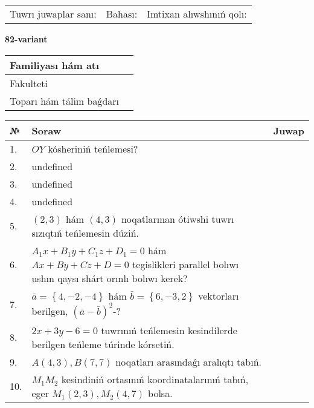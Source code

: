 \documentclass{article}
\begin{document}
\vspace{0.7cm}

\begin{tabular}{lll}
Tuwrı juwaplar sanı: \underline{\hspace{1cm}} & 
Bahası: \underline{\hspace{1cm}} & 
Imtixan alıwshınıń qolı: \underline{\hspace{2cm}} \\
\end{tabular}

\egroup

\newpage


\textbf{82-variant}\\

\bgroup
\def\arraystretch{1.6} %

\begin{tabular}{|m{5.7cm}|m{9.5cm}|}
\hline
Familiyası hám atı & \\
\hline
Fakulteti  & \\
\hline
Toparı hám tálim baǵdarı  & \\
\hline
\end{tabular}

\vspace{0.7cm}

\begin{tabular}{|m{0.7cm}|m{10cm}|m{4cm}|}
\hline
№ & Soraw & Juwap \\
\hline
1. & \(OY\) kósheriniń teńlemesi? &  \\
\hline
2. & undefined &  \\
\hline
3. & undefined &  \\
\hline
4. & undefined &  \\
\hline
5. & $(2, 3)$ hám $(4, 3)$ noqatlarınan ótiwshi tuwrı sızıqtıń teńlemesin dúziń. &  \\
\hline
6. & \(A_{1}x + B_{1}y + C_{1}z + D_{1} = 0\) hám \(Ax + By + Cz + D = 0\) tegislikleri parallel bolıwı ushın qaysı shárt orınlı bolıwı kerek? &  \\
\hline
7. & \(\bar{a} = \left\{ 4,- 2,- 4 \right\}\) hám \(\bar{b} = \left\{ 6,- 3, 2 \right\}\) vektorları berilgen, \((\bar{a} - \bar{b}) ^{2}\)-? &  \\
\hline
8. & \(2 x + 3 y - 6 = 0\) tuwrınıń teńlemesin kesindilerde berilgen teńleme túrinde kórsetiń. &  \\
\hline
9. & \(A (4, 3), B (7, 7)\) noqatları arasındaǵı aralıqtı tabıń. &  \\
\hline
10. & \(M_{1}M_{2}\) kesindiniń ortasınıń koordinatalarınıń tabıń, eger \(M_{1} (2, 3), M_{2} (4, 7)\) bolsa. & \\
\hline
\end{tabular}
\end{document}

